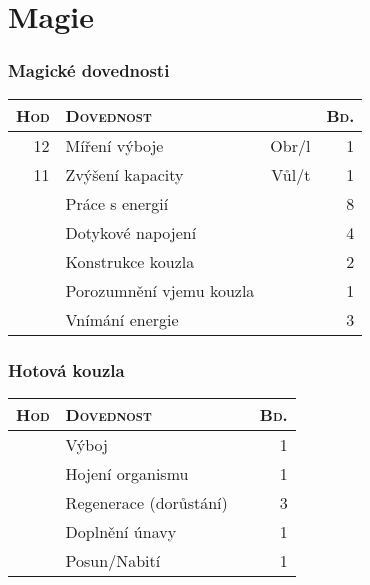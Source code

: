 \documentclass[11pt]{article}
\newenvironment{skilltab}[1][t]
{
\begin{tabular}[#1]{|r|l>{\sc}r|r|} \hline
  \textsc{Hod} & \multicolumn{2}{l|}{\textsc{Dovednost}} & \textsc{Bd.} \\ \hline
}
{
\end{tabular}
}
\begin{document}
\newpage
\begin{minipage}[t]{162mm}

\part*{Magie}

  \begin{minipage}[t]{0.48\textwidth}

    \section*{Magické dovednosti}\vspace{-1em}
    \begin{skilltab}
      12 & Míření výboje & Obr/l & 1 \\ \hline
      11 & Zvýšení kapacity & Vůl/t & 1 \\ \hline
        & Práce s energií & & 8 \\ \hline
        & Dotykové napojení & & 4 \\ \hline
        & Konstrukce kouzla & & 2 \\ \hline
        & Porozumnění vjemu kouzla & & 1 \\ \hline
        & Vnímání energie & & 3 \\ \hline
    \end{skilltab}

  \end{minipage}
  \hspace{0.02\textwidth}
  \begin{minipage}[t]{0.48\textwidth}

    \section*{Hotová kouzla}\vspace{-1em}
    \begin{skilltab}
      & Výboj & \hspace{2.7em} & 1 \\ \hline
      & Hojení organismu & & 1 \\ \hline
      & Regenerace (dorůstání) & & 3 \\ \hline
      & Doplnění únavy & & 1 \\ \hline
      & Posun/Nabití & & 1 \\ \hline
    \end{skilltab}


\end{minipage}
\end{minipage}
\end{document}
